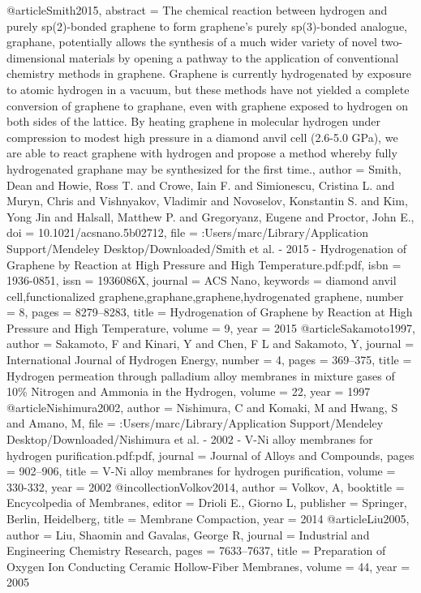@article{Smith2015,
abstract = {The chemical reaction between hydrogen and purely sp(2)-bonded graphene to form graphene's purely sp(3)-bonded analogue, graphane, potentially allows the synthesis of a much wider variety of novel two-dimensional materials by opening a pathway to the application of conventional chemistry methods in graphene. Graphene is currently hydrogenated by exposure to atomic hydrogen in a vacuum, but these methods have not yielded a complete conversion of graphene to graphane, even with graphene exposed to hydrogen on both sides of the lattice. By heating graphene in molecular hydrogen under compression to modest high pressure in a diamond anvil cell (2.6-5.0 GPa), we are able to react graphene with hydrogen and propose a method whereby fully hydrogenated graphane may be synthesized for the first time.},
author = {Smith, Dean and Howie, Ross T. and Crowe, Iain F. and Simionescu, Cristina L. and Muryn, Chris and Vishnyakov, Vladimir and Novoselov, Konstantin S. and Kim, Yong Jin and Halsall, Matthew P. and Gregoryanz, Eugene and Proctor, John E.},
doi = {10.1021/acsnano.5b02712},
file = {:Users/marc/Library/Application Support/Mendeley Desktop/Downloaded/Smith et al. - 2015 - Hydrogenation of Graphene by Reaction at High Pressure and High Temperature.pdf:pdf},
isbn = {1936-0851},
issn = {1936086X},
journal = {ACS Nano},
keywords = {diamond anvil cell,functionalized graphene,graphane,graphene,hydrogenated graphene},
number = {8},
pages = {8279--8283},
title = {{Hydrogenation of Graphene by Reaction at High Pressure and High Temperature}},
volume = {9},
year = {2015}
}
@article{Sakamoto1997,
author = {Sakamoto, F and Kinari, Y and Chen, F L and Sakamoto, Y},
journal = {International Journal of Hydrogen Energy},
number = {4},
pages = {369--375},
title = {{Hydrogen permeation through palladium alloy membranes in mixture gases of 10{\%} Nitrogen and Ammonia in the Hydrogen}},
volume = {22},
year = {1997}
}
@article{Nishimura2002,
author = {Nishimura, C and Komaki, M and Hwang, S and Amano, M},
file = {:Users/marc/Library/Application Support/Mendeley Desktop/Downloaded/Nishimura et al. - 2002 - V-Ni alloy membranes for hydrogen purification.pdf:pdf},
journal = {Journal of Alloys and Compounds},
pages = {902--906},
title = {{V-Ni alloy membranes for hydrogen purification}},
volume = {330-332},
year = {2002}
}
@incollection{Volkov2014,
author = {Volkov, A},
booktitle = {Encycolpedia of Membranes},
editor = {{Drioli E.}, Giorno L},
publisher = {Springer, Berlin, Heidelberg},
title = {{Membrane Compaction}},
year = {2014}
}
@article{Liu2005,
author = {Liu, Shaomin and Gavalas, George R},
journal = {Industrial and Engineering Chemistry Research},
pages = {7633--7637},
title = {{Preparation of Oxygen Ion Conducting Ceramic Hollow-Fiber Membranes}},
volume = {44},
year = {2005}
}
